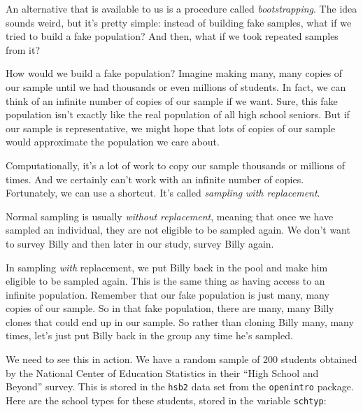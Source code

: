 \documentclass[
]{book}
\newenvironment{Shaded}{\begin{snugshade}}{\end{snugshade}}
\newcommand{\NormalTok}[1]{#1}
\newcommand{\SpecialCharTok}[1]{\textcolor[rgb]{0.00,0.00,0.00}{#1}}
\begin{document}
An alternative that is available to us is a procedure called \emph{bootstrapping}. The idea sounds weird, but it's pretty simple: instead of building fake samples, what if we tried to build a fake population? And then, what if we took repeated samples from it?

How would we build a fake population? Imagine making many, many copies of our sample until we had thousands or even millions of students. In fact, we can think of an infinite number of copies of our sample if we want. Sure, this fake population isn't exactly like the real population of all high school seniors. But if our sample is representative, we might hope that lots of copies of our sample would approximate the population we care about.

Computationally, it's a lot of work to copy our sample thousands or millions of times. And we certainly can't work with an infinite number of copies. Fortunately, we can use a shortcut. It's called \emph{sampling with replacement}.

Normal sampling is usually \emph{without replacement}, meaning that once we have sampled an individual, they are not eligible to be sampled again. We don't want to survey Billy and then later in our study, survey Billy again.

In sampling \emph{with} replacement, we put Billy back in the pool and make him eligible to be sampled again. This is the same thing as having access to an infinite population. Remember that our fake population is just many, many copies of our sample. So in that fake population, there are many, many Billy clones that could end up in our sample. So rather than cloning Billy many, many times, let's just put Billy back in the group any time he's sampled.

We need to see this in action. We have a random sample of 200 students obtained by the National Center of Education Statistics in their ``High School and Beyond'' survey. This is stored in the \texttt{hsb2} data set from the \texttt{openintro} package. Here are the school types for these students, stored in the variable \texttt{schtyp}:

\begin{Shaded}
\end{Shaded}
\end{document}
